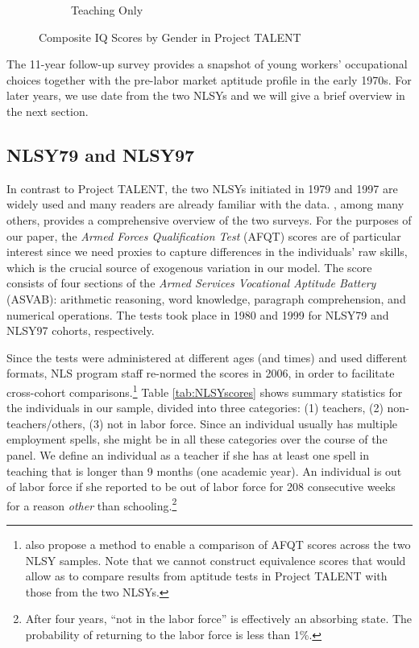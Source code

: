 \documentclass[onehalfspacing,11pt]{article}
\begin{document}
\begin{figure}
\begin{subfigure}{0.49\textwidth}
	\caption{Teaching Only}
	\label{fig:IQbygenderteach}
	\end{subfigure}
	\caption{Composite IQ Scores by Gender in Project TALENT}
	\label{fig:IQbygender}
\end{figure}

The 11-year follow-up survey provides a snapshot of young workers' occupational choices together with the pre-labor market aptitude profile in the early 1970s. For later years, we use date from the two NLSYs and we will give a brief overview in the next section.

\subsection{NLSY79 and NLSY97}
In contrast to Project TALENT, the two NLSYs initiated in 1979 and 1997 are widely used and many readers are already familiar with the data. \cite{Cooksey:2018}, among many others, provides a comprehensive overview of the two surveys. For the purposes of our paper, the {\it Armed Forces Qualification Test} (AFQT) scores are of particular interest since we need proxies to capture differences in the individuals' raw skills, which is the crucial source of exogenous variation in our model. The score consists of four sections of the {\it Armed Services Vocational Aptitude Battery} (ASVAB): arithmetic reasoning, word knowledge, paragraph comprehension, and numerical operations. The tests took place in 1980 and 1999 for NLSY79 and NLSY97 cohorts, respectively.

Since the tests were administered at different ages (and times) and used different formats, NLS program staff re-normed the scores in 2006, in order to facilitate cross-cohort comparisons.\footnote{\cite{Altonji:2009} also propose a method to enable a comparison of AFQT scores across the two NLSY samples. Note that we cannot construct equivalence scores that would allow as to compare results from aptitude tests in Project TALENT with those from the two NLSYs.} Table \ref{tab:NLSYscores} shows summary statistics for the individuals in our sample, divided into three categories: (1) teachers, (2) non-teachers/others, (3) not in labor force. Since an individual usually has multiple employment spells, she might be in all these categories over the course of the panel. We define an individual as a teacher if she has at least one spell in teaching that is longer than 9 months (one academic year). An individual is out of labor force if she reported to be out of labor force for 208 consecutive weeks for a reason {\it other} than schooling.\footnote{After four years, ``not in the labor force'' is effectively an absorbing state. The probability of returning to the labor force is less than 1\%.}
\end{document}
